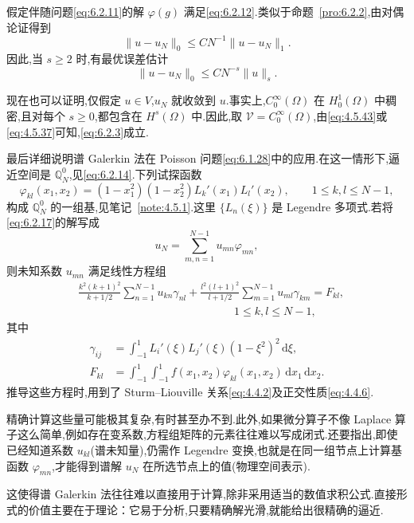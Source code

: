 假定伴随问题\eqref{eq:6.2.11}的解 \(\varphi(g)\) 满足\eqref{eq:6.2.12}.类似于命题~\ref{pro:6.2.2},由对偶论证得到
\[
  \|u-u_N\|_0\le CN^{-1}\|u-u_N\|_1.
\]
因此,当 \(s\ge2\) 时,有最优误差估计
\begin{equation}\label{eq:6.2.19}
  \|u-u_N\|_0\le CN^{-s}\|u\|_s.
\end{equation}

现在也可以证明,仅假定 \(u\in V\),\(u_N\) 就收敛到 \(u\).事实上,\(C_0^\infty(\Omega)\) 在 \(H_0^1(\Omega)\) 中稠密,且对每个 \(s\ge0\),都包含在 \(H^s(\Omega)\) 中.因此,取 \(\mathcal V=C_0^\infty(\Omega)\),由\eqref{eq:4.5.43}或\eqref{eq:4.5.37}可知,\eqref{eq:6.2.3}成立.

最后详细说明谱 Galerkin 法在 Poisson 问题\eqref{eq:6.1.28}中的应用.在这一情形下,逼近空间是 \(\mathbb Q_N^0\),见\eqref{eq:6.2.14}.下列试探函数
\begin{equation}\label{eq:6.2.20}
  \varphi_{kl}(x_1,x_2)
    =(1-x_1^2)(1-x_2^2)L_k'(x_1)L_l'(x_2),
  \qquad1\le k,l\le N-1,
\end{equation}
构成 \(\mathbb Q_N^0\) 的一组基,见笔记~\ref{note:4.5.1}.这里 \(\{L_n(\xi)\}\) 是 Legendre 多项式.若将\eqref{eq:6.2.17}的解写成
\[
  u_N=\sum_{m,n=1}^{N-1}u_{mn}\varphi_{mn},
\]
则未知系数 \(u_{mn}\) 满足线性方程组
\[
  \begin{aligned}
    &\frac{k^2(k+1)^2}{k+1/2}\sum_{n=1}^{N-1}u_{kn}\gamma_{nl}
      +\frac{l^2(l+1)^2}{l+1/2}\sum_{m=1}^{N-1}u_{ml}\gamma_{km}=F_{kl},\\
    &\hspace{14em}1\le k,l\le N-1,
  \end{aligned}
\]
其中
\[
  \begin{aligned}
    \gamma_{ij}&=\int_{-1}^1 L_i'(\xi)L_j'(\xi)(1-\xi^2)^2\,\mathrm d\xi,\\
    F_{kl}&=\int_{-1}^1\int_{-1}^1 f(x_1,x_2)\varphi_{kl}(x_1,x_2)\,\mathrm dx_1\,\mathrm dx_2.
  \end{aligned}
\]
推导这些方程时,用到了 Sturm--Liouville 关系\eqref{eq:4.4.2}及正交性质\eqref{eq:4.4.6}.

精确计算这些量可能极其复杂,有时甚至办不到.此外,如果微分算子不像 Laplace 算子这么简单,例如存在变系数,方程组矩阵的元素往往难以写成闭式.还要指出,即使已经知道系数 \(u_{kl}\)(谱未知量),仍需作 Legendre 变换,也就是在同一组节点上计算基函数 \(\varphi_{mn}\),才能得到谱解 \(u_N\) 在所选节点上的值(物理空间表示).

这使得谱 Galerkin 法往往难以直接用于计算,除非采用适当的数值求积公式.直接形式的价值主要在于理论：它易于分析,只要精确解光滑,就能给出很精确的逼近.

